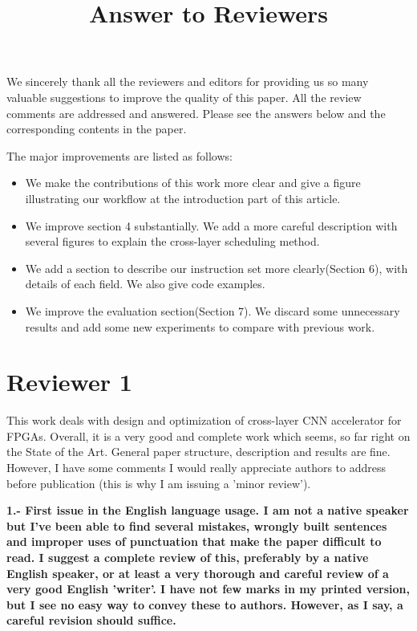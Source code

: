 \documentclass[12pt]{paper}
\title{Answer to Reviewers}
\newcommand{\rev}[1]{{{\color[rgb]{0,0,1}{#1}}}}
\newcommand{\reviewer}[1]{\section*{Reviewer #1}}
\newcommand{\comment}[1]{\noindent\textbf{#1}\\}
\begin{document}
\maketitle

We sincerely thank all the reviewers and editors for providing us so many valuable suggestions to improve the quality of this paper. All the review comments are addressed and answered. Please see the answers below and the corresponding contents in the paper.

\rev{The newly added contents and the major revised contents are marked in blue in the paper and in this letter.}

The major improvements are listed as follows:



\begin{itemize}
    \item We make the contributions of this work more clear and give a figure illustrating our workflow at the introduction part of this article. 

    \item We improve section 4 substantially. We add a more careful description with several figures to explain the cross-layer scheduling method.

    \item We add a section to describe our instruction set more clearly(Section 6), with details of each field. We also give code examples.
    
    \item We improve the evaluation section(Section 7). We discard some unnecessary results and add some new experiments to compare with previous work.

\end{itemize}

\reviewer{1}

This work deals with design and optimization of cross-layer CNN accelerator for FPGAs. Overall, it is a very good and complete work which seems, so far right on the State of the Art. General paper structure, description and results are fine. However, I have some comments I would really appreciate authors to address before publication (this is why I am issuing a 'minor review'). 

\comment{1.- First issue in the English language usage. I am not a native speaker but I've been able to find several mistakes, wrongly built sentences and improper uses of punctuation that make the paper difficult to read. I suggest a complete review of this, preferably by a native English speaker, or at least a very thorough and careful review of a very good English 'writer'. I have not few marks in my printed version, but I see no easy way to convey these to authors. However, as I say, a careful revision should suffice.}
\end{document}
